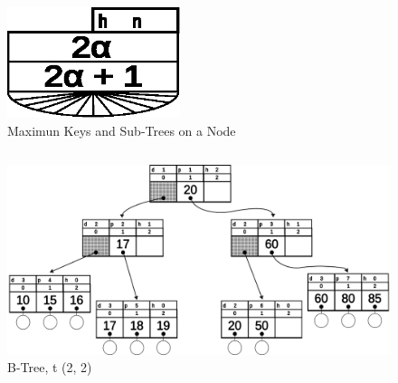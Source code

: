 \begin{frame}
\begin{columns}
\begin{column}{0.5\textwidth}
                \begin{figure}
                    \includegraphics[width=0.45\textwidth]{resources/made/max_node.eps}
                    \caption[]{Maximun Keys and Sub-Trees on a Node}
                \end{figure}
        \end{column}
    \end{columns}
    
    \framebreak{}

    \begin{figure}
        \centering
        \includegraphics[width=0.95\linewidth,keepaspectratio]{resources/made/mendivelso_a2_btree.eps}
        \caption[]{B-Tree, t (2, 2)}
    \end{figure}

    \framebreak{}


\end{frame}
